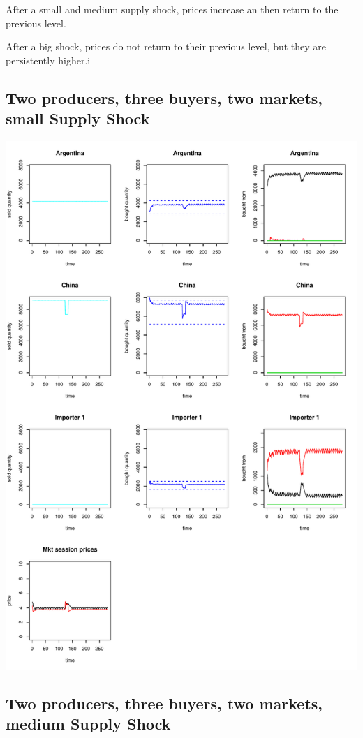\documentclass{article}
\begin{document}
After a small and medium supply shock, prices increase an then return to the previous level.

After a big shock, prices do not return to their previous level, but they are persistently higher.i


\newpage
\subsection{Two producers, three buyers, two markets, small Supply Shock}

\includegraphics[scale=0.55]{figs_small}

\subsection{Two producers, three buyers, two markets, medium Supply Shock}
\end{document}
